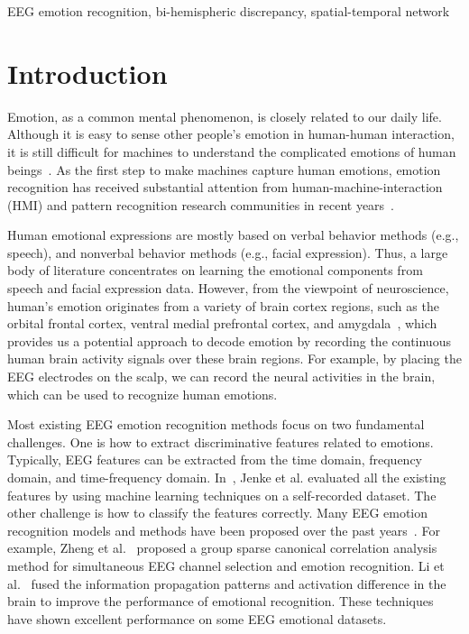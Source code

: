 \documentclass[journal]{IEEEtran}
\begin{document}
\begin{IEEEkeywords}
 EEG emotion recognition, bi-hemispheric discrepancy, spatial-temporal network
\end{IEEEkeywords}


\IEEEpeerreviewmaketitle






\section{Introduction}
Emotion, as a common mental phenomenon, is closely related to our daily life. Although it is easy to sense other people's emotion in human-human interaction, it is still difficult for machines to understand the complicated emotions of human beings~\cite{picard2000affective}. As the first step to make machines capture human emotions, emotion recognition has received substantial attention from human-machine-interaction (HMI) and pattern recognition research communities in recent years~\cite{cowie2001emotion,lin2010eeg,zheng2018emotionmeter}.

Human emotional expressions are mostly based on verbal behavior methods (e.g., speech), and nonverbal behavior methods (e.g., facial expression). Thus, a large body of literature concentrates on learning the emotional components from speech and facial expression data. However, from the viewpoint of neuroscience, human’s emotion originates from a variety of brain cortex regions, such as the orbital frontal cortex, ventral medial prefrontal cortex, and amygdala~\cite{britton2006neural}, which provides us a potential approach to decode emotion by recording the continuous human brain activity signals over these brain regions. For example, by placing the EEG electrodes on the scalp, we can record the neural activities in the brain, which can be used to recognize human emotions.

Most existing EEG emotion recognition methods focus on two fundamental challenges. One is how to extract discriminative features related to emotions. Typically, EEG features can be extracted from the time domain, frequency domain, and time-frequency domain. In~\cite{jenke2014feature}, Jenke et al. evaluated all the existing features by using machine learning techniques on a self-recorded dataset. The other challenge is how to classify the features correctly. Many EEG emotion recognition models and methods have been proposed over the past years~\cite{alarcao2017emotions,garcia2019review}. For example, Zheng et al.~\cite{zheng2016Multichannel} proposed a group sparse canonical correlation analysis method for simultaneous EEG channel selection and emotion recognition. Li et al.~\cite{li2019eeg} fused the information propagation patterns and activation difference in the brain to improve the performance of emotional recognition. These techniques have shown excellent performance on some EEG emotional datasets.
\end{document}
